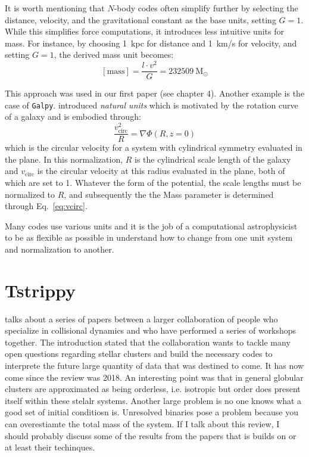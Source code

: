     It is worth mentioning that $N$-body codes often simplify further by selecting the distance, velocity, and the gravitational constant as the base units, setting $G=1$. While this simplifies force computations, it introduces less intuitive units for mass. For instance, by choosing 1~kpc for distance and 1~km/s for velocity, and setting $G=1$, the derived mass unit becomes: 
    \begin{equation}
        \left[\mathrm{mass}\right] = \frac{l \cdot v^2}{G} = 232509~\mathrm{M}_\odot
    \end{equation}

    This approach was used in our first paper (see chapter 4). Another example is the case of \texttt{Galpy}. \citet{2015ApJS..216...29B} introduced \textit{natural units} which is motivated by the rotation curve of a galaxy and is embodied through: 
    \begin{equation}
        \frac{v_\mathrm{circ}^2}{R} = \nabla  \Phi \left(R, z=0\right)
        \label{eq:vcirc}
    \end{equation}
    which is the circular velocity for a system with cylindrical symmetry evaluated in the plane. In this normalization, $R$ is the cylindrical scale length of the galaxy and $v_\mathrm{circ}$ is the circular velocity at this radius evaluated in the plane, both of which are set to 1. Whatever the form of the potential, the scale lengths must be normalized to $R$, and subsequently the the Mass parameter is determined through Eq.~\ref{eq:vcirc}. 

    Many codes use various units and it is the job of a computational astrophysicist to be as flexible as possible in understand how to change from one unit system and normalization to another. 

    


    
    

\section{Tstrippy}

    \citet{2018ComAC...5....2V} talks about a series of papers between a larger collaboration of people who specialize in collisional dynamics and who have performed a series of workshops together. The introduction stated that the collaboration wants to tackle many open questions regarding stellar clusters and build the necessary codes to interprete the future large quantity of data that was destined to come. It has now come since the review was 2018. An interesting point was that in general globular clusters are approximated as being orderless, i.e. isotropic but order does present itself within these stelalr systems. Another large problem is no one knows what a good set of initial conditiosn is. Unresolved binaries pose a problem because you can overestiamte the total mass of the system. If I talk about this review, I should probably discuss some of the results from the papers that is builds on or at least their techinques.

